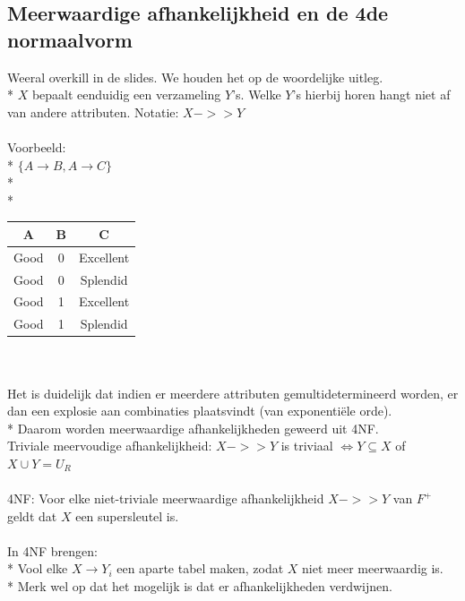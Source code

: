 \documentclass[10pt]{article}
\begin{document}
\subsection{Meerwaardige afhankelijkheid en de 4de normaalvorm}
Weeral overkill in de slides. We houden het op de woordelijke uitleg.\\*
$X$ bepaalt eenduidig een verzameling $Y$'s. Welke $Y$'s hierbij horen hangt niet af van andere attributen. Notatie: $X ->> Y$\\\\
Voorbeeld:\\*
$\{A \rightarrow B, A \rightarrow C\}$\\*\\*
\begin{tabular}{| c | c | c |} \hline
  A & B & C\\ \hline
  Good & 0 & Excellent\\ \hline
  Good & 0 & Splendid\\ \hline
  Good & 1 & Excellent\\ \hline
  Good & 1 & Splendid\\ \hline
\end{tabular}\\\\
Het is duidelijk dat indien er meerdere attributen gemultidetermineerd worden, er dan een explosie aan combinaties plaatsvindt (van exponenti\"ele orde).\\*
Daarom worden meerwaardige afhankelijkheden geweerd uit 4NF.\\
Triviale meervoudige afhankelijkheid: $X ->> Y$ is triviaal $\Leftrightarrow Y \subseteq X$ of $X \cup Y = U_R$\\\\
4NF: Voor elke niet-triviale meerwaardige afhankelijkheid $X ->> Y$ van $F^+$ geldt dat $X$ een supersleutel is.\\\\
In 4NF brengen:\\*
Vool elke $X \rightarrow Y_i$ een aparte tabel maken, zodat $X$ niet meer meerwaardig is.\\*
Merk wel op dat het mogelijk is dat er afhankelijkheden verdwijnen.
\end{document}
